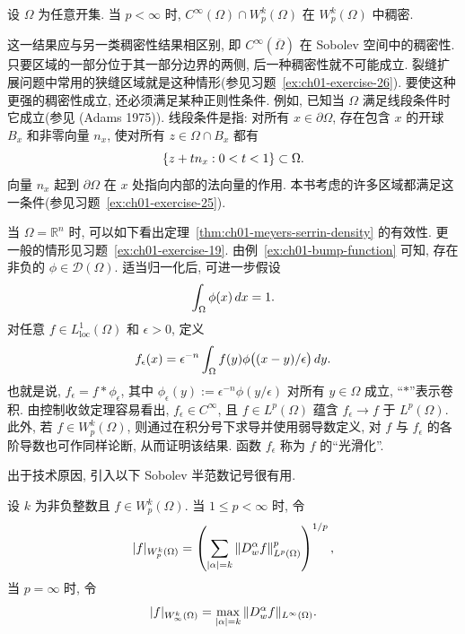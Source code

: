 \setcounter{thmcount}{3}
\begin{Theorem}
\label{thm:ch01-meyers-serrin-density}
设 $\Omega$ 为任意开集. 当 $p<\infty$ 时, $C^\infty(\Omega)\cap W_p^k(\Omega)$ 在 $W_p^k(\Omega)$ 中稠密.
\end{Theorem}

\begin{Remark}
\label{rem:ch01-boundary-smooth-density}
这一结果应与另一类稠密性结果相区别, 即 $C^\infty(\overline\Omega)$ 在 Sobolev 空间中的稠密性. 只要区域的一部分位于其一部分边界的两侧, 后一种稠密性就不可能成立. 裂缝扩展问题中常用的狭缝区域就是这种情形(参见习题~\ref{ex:ch01-exercise-26}). 要使这种更强的稠密性成立, 还必须满足某种正则性条件. 例如, 已知当 $\Omega$ 满足线段条件时它成立(参见 (Adams 1975)). 线段条件是指: 对所有 $x\in\partial\Omega$, 存在包含 $x$ 的开球 $B_x$ 和非零向量 $n_x$, 使对所有 $z\in\Omega\cap B_x$ 都有
\[
\MathBookFormulaID{formula-ch01-segment-condition}
\{z+tn_x:0<t<1\}\subset\Omega.
\]
向量 $n_x$ 起到 $\partial\Omega$ 在 $x$ 处指向内部的法向量的作用. 本书考虑的许多区域都满足这一条件(参见习题~\ref{ex:ch01-exercise-25}).
\end{Remark}

\begin{Remark}
\label{rem:ch01-mollification-density}
当 $\Omega=\mathbb R^n$ 时, 可以如下看出定理~\ref{thm:ch01-meyers-serrin-density} 的有效性. 更一般的情形见习题~\ref{ex:ch01-exercise-19}. 由例~\ref{ex:ch01-bump-function} 可知, 存在非负的 $\phi\in\mathcal D(\Omega)$. 适当归一化后, 可进一步假设
\[
\MathBookFormulaID{formula-ch01-mollifier-normalization}
\int_\Omega\phi(x)\,dx=1.
\]
对任意 $f\in L_{\mathrm{loc}}^1(\Omega)$ 和 $\epsilon>0$, 定义
\[
\MathBookFormulaID{formula-ch01-mollification}
f_\epsilon(x)=\epsilon^{-n}\int_\Omega f(y)
\phi\bigl((x-y)/\epsilon\bigr)\,dy.
\]
也就是说, $f_\epsilon=f*\phi_\epsilon$, 其中 $\phi_\epsilon(y):=\epsilon^{-n}\phi(y/\epsilon)$ 对所有 $y\in\Omega$ 成立, ``$*$''表示卷积. 由控制收敛定理容易看出, $f_\epsilon\in C^\infty$, 且 $f\in L^p(\Omega)$ 蕴含 $f_\epsilon\to f$ 于 $L^p(\Omega)$. 此外, 若 $f\in W_p^k(\Omega)$, 则通过在积分号下求导并使用弱导数定义, 对 $f$ 与 $f_\epsilon$ 的各阶导数也可作同样论断, 从而证明该结果. 函数 $f_\epsilon$ 称为 $f$ 的``光滑化''.
\end{Remark}

出于技术原因, 引入以下 Sobolev 半范数记号很有用.

\begin{Definition}
\label{def:ch01-sobolev-seminorm}
设 $k$ 为非负整数且 $f\in W_p^k(\Omega)$. 当 $1\leq p<\infty$ 时, 令
\[
\MathBookFormulaID{formula-ch01-sobolev-seminorm-finite-p}
|f|_{W_p^k(\Omega)}=
\left(\sum_{|\alpha|=k}\|D_w^\alpha f\|_{L^p(\Omega)}^p\right)^{1/p},
\]
当 $p=\infty$ 时, 令
\[
\MathBookFormulaID{formula-ch01-sobolev-seminorm-infinity}
|f|_{W_\infty^k(\Omega)}=
\max_{|\alpha|=k}\|D_w^\alpha f\|_{L^\infty(\Omega)}.
\]
\end{Definition}

